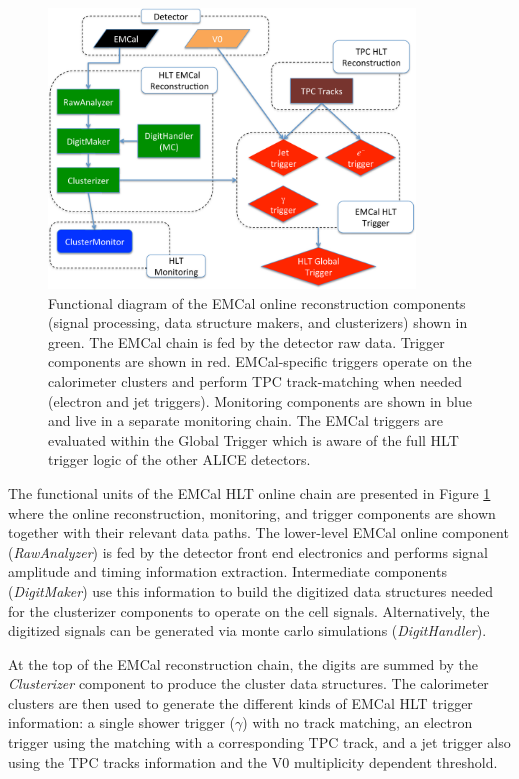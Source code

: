 \begin{figure}[ht]
\begin{center}
\includegraphics[width=23pc]{figures/chain-new.pdf}
\caption{\label{f1} Functional diagram of the EMCal online reconstruction components (signal processing, data structure makers, and clusterizers) shown in green. 
The EMCal chain is fed by the detector raw data. Trigger components are shown in red. EMCal-specific triggers operate on the calorimeter clusters
and perform TPC track-matching when needed (electron and jet triggers). Monitoring components are shown in blue and live in a separate monitoring chain.
The EMCal triggers are evaluated within the Global Trigger which is aware of the full HLT trigger logic of the other ALICE detectors.  
}
\end{center}
\end{figure}

The functional units of the EMCal HLT online chain are presented in Figure \ref{f1} where
the online reconstruction, monitoring, and trigger components 
are shown together with their relevant data paths.
The lower-level EMCal online component ({\it RawAnalyzer}) is fed by the detector front end electronics
and performs signal amplitude and timing information extraction.
Intermediate components ({\it DigitMaker}) use this information to 
build the digitized data structures needed for the clusterizer components to operate on the cell signals. 
Alternatively, the digitized signals can be generated via monte carlo simulations ({\it DigitHandler}).

At the top of the EMCal reconstruction chain, the digits are summed by the {\it Clusterizer} component to produce the cluster data structures. 
The calorimeter clusters are then used to generate the different kinds of EMCal HLT trigger information:
a single shower trigger ($\gamma$) with no track matching, an electron trigger using the matching with a corresponding TPC track,
and a jet trigger also using the TPC tracks information and the V0 multiplicity dependent threshold.

